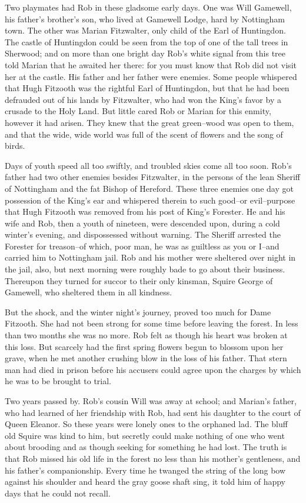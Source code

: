 Two playmates had Rob in these gladsome early days. One was Will
Gamewell, his father's brother's son, who lived at Gamewell Lodge, hard
by Nottingham town. The other was Marian Fitzwalter, only child of the
Earl of Huntingdon. The castle of Huntingdon could be seen from the top
of one of the tall trees in Sherwood; and on more than one bright day
Rob's white signal from this tree told Marian that he awaited her there:
for you must know that Rob did not visit her at the castle. His father
and her father were enemies. Some people whispered that Hugh Fitzooth
was the rightful Earl of Huntingdon, but that he had been defrauded out
of his lands by Fitzwalter, who had won the King's favor by a crusade to
the Holy Land. But little cared Rob or Marian for this enmity, however
it had arisen. They knew that the great green--wood was open to them,
and that the wide, wide world was full of the scent of flowers and the
song of birds.

Days of youth speed all too swiftly, and troubled skies come all too
soon. Rob's father had two other enemies besides Fitzwalter, in the
persons of the lean Sheriff of Nottingham and the fat Bishop of
Hereford. These three enemies one day got possession of the King's ear
and whispered therein to such good--or evil--purpose that Hugh Fitzooth
was removed from his post of King's Forester. He and his wife and Rob,
then a youth of nineteen, were descended upon, during a cold winter's
evening, and dispossessed without warning. The Sheriff arrested the
Forester for treason--of which, poor man, he was as guiltless as you or
I--and carried him to Nottingham jail. Rob and his mother were sheltered
over night in the jail, also, but next morning were roughly bade to go
about their business. Thereupon they turned for succor to their only
kinsman, Squire George of Gamewell, who sheltered them in all kindness.

But the shock, and the winter night's journey, proved too much for Dame
Fitzooth. She had not been strong for some time before leaving the
forest. In less than two months she was no more. Rob felt as though his
heart was broken at this loss. But scarcely had the first spring flowers
begun to blossom upon her grave, when he met another crushing blow in
the loss of his father. That stern man had died in prison before his
accusers could agree upon the charges by which he was to be brought to
trial.

Two years passed by. Rob's cousin Will was away at school; and Marian's
father, who had learned of her friendship with Rob, had sent his
daughter to the court of Queen Eleanor. So these years were lonely ones
to the orphaned lad. The bluff old Squire was kind to him, but secretly
could make nothing of one who went about brooding and as though seeking
for something he had lost. The truth is that Rob missed his old life in
the forest no less than his mother's gentleness, and his father's
companionship. Every time he twanged the string of the long bow against
his shoulder and heard the gray goose shaft sing, it told him of happy
days that he could not recall.

